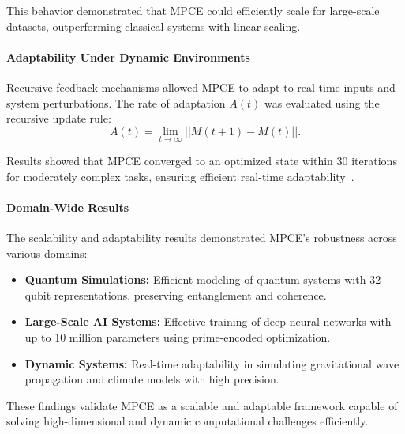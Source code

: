 \documentclass{article}
\theoremstyle{plain}
\begin{document}
This behavior demonstrated that MPCE could efficiently scale for large-scale datasets, outperforming classical systems with linear scaling.

\paragraph{Adaptability Under Dynamic Environments}

Recursive feedback mechanisms allowed MPCE to adapt to real-time inputs and system perturbations. The rate of adaptation \( A(t) \) was evaluated using the recursive update rule:
\begin{equation}
    A(t) = \lim_{t \to \infty} || M(t+1) - M(t) ||.
\end{equation}

Results showed that MPCE converged to an optimized state within 30 iterations for moderately complex tasks, ensuring efficient real-time adaptability~\cite{grover1996fast}.

\paragraph{Domain-Wide Results}

The scalability and adaptability results demonstrated MPCE's robustness across various domains:
\begin{itemize}
    \item \textbf{Quantum Simulations:} Efficient modeling of quantum systems with 32-qubit representations, preserving entanglement and coherence.
    \item \textbf{Large-Scale AI Systems:} Effective training of deep neural networks with up to 10 million parameters using prime-encoded optimization.
    \item \textbf{Dynamic Systems:} Real-time adaptability in simulating gravitational wave propagation and climate models with high precision.
\end{itemize}

\noindent These findings validate MPCE as a scalable and adaptable framework capable of solving high-dimensional and dynamic computational challenges efficiently.




\end{document}
